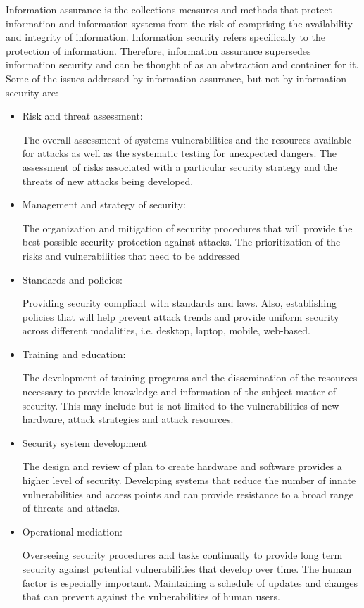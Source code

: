 \documentclass[11pt]{article}
\begin{document}
\begin{flushleft}
Information assurance is the collections measures and methods that protect information and information systems from the risk of comprising the availability and integrity of information. Information security refers specifically to the protection of information. Therefore, information assurance  supersedes information security and can be thought of as an abstraction and container for it. Some of the issues addressed by information assurance, but not by information security are:

\begin{itemize}
\item Risk and threat assessment: 

The overall assessment of systems vulnerabilities and the resources available for attacks as well as the systematic testing for unexpected dangers. The assessment of risks associated with a particular security strategy and the threats of new attacks being developed. 

\item Management and strategy of security:

The organization and mitigation of security procedures that will provide the best possible security protection against attacks. The prioritization of the risks and vulnerabilities that need to be addressed

\item Standards and policies:

Providing security compliant with standards and laws. Also, establishing policies that will help prevent attack trends and provide uniform security across different modalities, i.e. desktop, laptop, mobile, web-based.

\item Training and education:

The development of training programs and the dissemination of the resources necessary to provide knowledge and information of the subject matter of security. This may include but is not limited to the vulnerabilities of new hardware, attack strategies and attack resources. 

\item Security system development

The design and review of plan to create hardware and software provides a higher level of security. Developing systems that reduce the number of innate vulnerabilities and access points and can provide resistance to a broad range of threats and attacks. 

\item Operational mediation:

Overseeing security procedures and tasks continually to provide long term security against potential vulnerabilities that develop over time. The human factor is especially important. Maintaining a schedule of updates and changes that can prevent against the vulnerabilities of human users.  



\end{itemize}
\end{flushleft}
\end{document}
